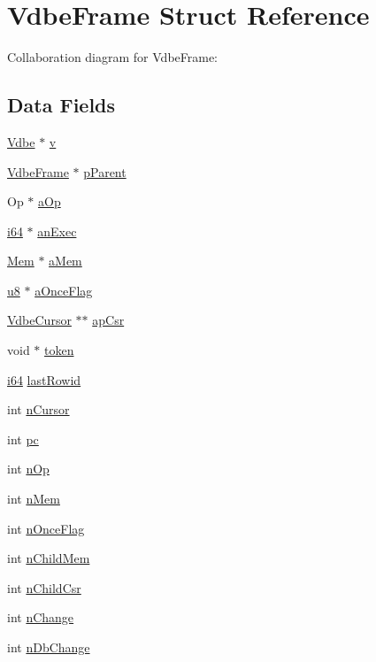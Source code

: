 \hypertarget{struct_vdbe_frame}{}\section{Vdbe\+Frame Struct Reference}
\label{struct_vdbe_frame}


Collaboration diagram for Vdbe\+Frame\+:
\subsection*{Data Fields}
\begin{DoxyCompactItemize}
\item 
\hyperlink{struct_vdbe}{Vdbe} $\ast$ \hyperlink{struct_vdbe_frame_a84655845ca6a8a0f807b442af4e7384b}{v}
\item 
\hyperlink{struct_vdbe_frame}{Vdbe\+Frame} $\ast$ \hyperlink{struct_vdbe_frame_a6ede48174ab6d1a31e3ed0506f5bf467}{p\+Parent}
\item 
Op $\ast$ \hyperlink{struct_vdbe_frame_a174225cf156b2753600dd11eefc2c992}{a\+Op}
\item 
\hyperlink{sqlite3_8c_a2a0f0f4ae7001eb54351f77ea1cdbcfd}{i64} $\ast$ \hyperlink{struct_vdbe_frame_aed4f7f86306b16502f77aebf2d09a5ff}{an\+Exec}
\item 
\hyperlink{struct_mem}{Mem} $\ast$ \hyperlink{struct_vdbe_frame_adfd56f8b1cc1790601ff0940d884c200}{a\+Mem}
\item 
\hyperlink{sqlite3_8c_a74a0f6424ae628af25f23f0a35f6ead3}{u8} $\ast$ \hyperlink{struct_vdbe_frame_ae7256911c06e37eb7d9e0ab9bb9df93e}{a\+Once\+Flag}
\item 
\hyperlink{struct_vdbe_cursor}{Vdbe\+Cursor} $\ast$$\ast$ \hyperlink{struct_vdbe_frame_ac1dd9d69a090bcc1bdb7afa3b0525eea}{ap\+Csr}
\item 
void $\ast$ \hyperlink{struct_vdbe_frame_aa80a17db18ac71350fa401959c59e642}{token}
\item 
\hyperlink{sqlite3_8c_a2a0f0f4ae7001eb54351f77ea1cdbcfd}{i64} \hyperlink{struct_vdbe_frame_ac7e3735a03635ad8ee39c159a889a920}{last\+Rowid}
\item 
int \hyperlink{struct_vdbe_frame_abd18ebaf2ce9128e5e45bd424af27002}{n\+Cursor}
\item 
int \hyperlink{struct_vdbe_frame_ac8c81e61335635fa4709d82412b31f06}{pc}
\item 
int \hyperlink{struct_vdbe_frame_a33625b7205f0da4b73ec34d2d4aefd64}{n\+Op}
\item 
int \hyperlink{struct_vdbe_frame_a857d199d972b4d3864ce420c143508e4}{n\+Mem}
\item 
int \hyperlink{struct_vdbe_frame_a391dfc763758d272dcce42b2b72826a7}{n\+Once\+Flag}
\item 
int \hyperlink{struct_vdbe_frame_a9c084a923065e168ff226201223a6c2d}{n\+Child\+Mem}
\item 
int \hyperlink{struct_vdbe_frame_a02ffedf6eb36618010bd2d4dba030bc8}{n\+Child\+Csr}
\item 
int \hyperlink{struct_vdbe_frame_a34a2d05071fd1eb026579e78343912a4}{n\+Change}
\item 
int \hyperlink{struct_vdbe_frame_a1efef3b338ec76df8eb738429ca474c0}{n\+Db\+Change}
\end{DoxyCompactItemize}


